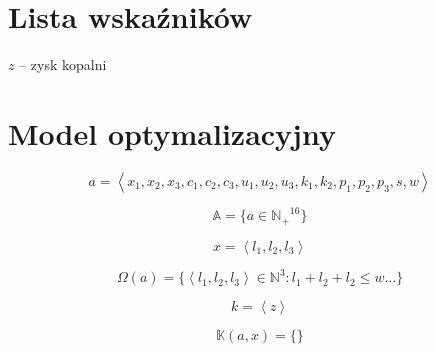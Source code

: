\documentclass[titlepage]{article}
\begin{document}
\section{Lista wskaźników}
$z$ -- zysk kopalni

\section{Model optymalizacyjny}
$$a = \left< x_1, x_2, x_3, c_1, c_2, c_3, u_1, u_2, u_3, k_1, k_2, p_1, p_2, p_3, s, w \right>$$

$$\mathbb{A} = \{ a \in \mathbb{N_+}^{16} \}$$

$$x = \left< l_1, l_2, l_3 \right>$$

$$\Omega(a) = \{ \left< l_1, l_2, l_3 \right> \in \mathbb{N}^3: l_1 + l_2 + l_2 \leq w \ldots \}$$

$$k = \left< z \right>$$

$$\mathbb{K}(a, x) = \{ \}$$
\end{document}
